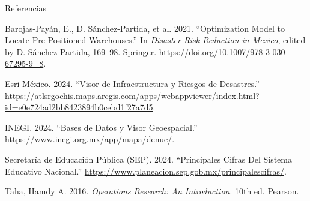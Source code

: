 \documentclass[
  ignorenonframetext,
]{beamer}
\newlength{\cslhangindent}
\newenvironment{CSLReferences}[2] %
 {\begin{list}{}{%
  \setlength{\itemindent}{0pt}
  \setlength{\leftmargin}{0pt}
  \setlength{\parsep}{0pt}
  \ifodd #1
   \setlength{\leftmargin}{\cslhangindent}
   \setlength{\itemindent}{-1\cslhangindent}
  \fi
  \setlength{\itemsep}{#2\baselineskip}}}
 {\end{list}}
\begin{document}
\begin{frame}{Referencias}
\label{referencias}
\label{refs}
\begin{CSLReferences}{1}{0}
Barojas-Payán, E., D. Sánchez-Partida, et al. 2021. {``Optimization
Model to Locate Pre-Positioned Warehouses.''} In \emph{Disaster Risk
Reduction in Mexico}, edited by D. Sánchez-Partida, 169--98. Springer.
\url{https://doi.org/10.1007/978-3-030-67295-9_8}.

Esri México. 2024. {``Visor de Infraestructura y Riesgos de
Desastres.''}
\url{https://atlsrgochis.maps.arcgis.com/apps/webappviewer/index.html?id=e0e724ad2bb8423894b0cebd1f27a7d5}.

INEGI. 2024. {``Bases de Datos y Visor Geoespacial.''}
\url{https://www.inegi.org.mx/app/mapa/denue/}.

Secretaría de Educación Pública (SEP). 2024. {``Principales Cifras Del
Sistema Educativo Nacional.''}
\url{https://www.planeacion.sep.gob.mx/principalescifras/}.

Taha, Hamdy A. 2016. \emph{Operations Research: An Introduction}. 10th
ed. Pearson.

\end{CSLReferences}
\end{frame}
\end{document}
